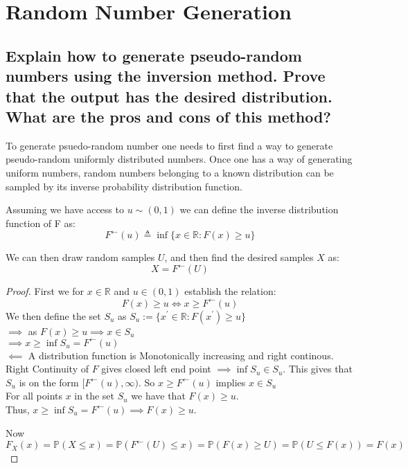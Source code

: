 \documentclass[a4paper]{article}
\begin{document}
  

\tableofcontents

\newpage

\section{Random Number Generation}

\subsection[The inversion method]{Explain how to generate pseudo-random numbers using the inversion method. Prove that the output has the desired distribution. What are the pros and cons of this method?}
To generate psuedo-random number one needs to first find a way to generate pseudo-random uniformly distributed numbers. Once one has a way of generating uniform numbers, random numbers belonging to a known distribution can be sampled by its inverse probability distribution function.

Assuming we have access to $u \sim (0,1)$ we can define the inverse distribution function of F as:
\begin{equation}
    F^\leftarrow(u) \triangleq \inf\{x\in\mathbb{R}: F(x) \geq u\}
\end{equation}

We can then draw random samples $U$, and then find the desired samples $X$ as:
\begin{equation}
    X = F^\leftarrow(U)
\end{equation}


\begin{proof}
    First we for $ x\in\mathbb{R}$ and $u \in(0,1)$ establish the relation:
    \begin{equation}
        F(x)\geq u\iff x\geq F^\leftarrow(u)
    \end{equation}
    We then define the set $S_u$ as $S_u :=\{x^\prime \in \mathbb{R} : F(x^\prime)\geq u\}$ \\
    $\implies$ as $F(x) \geq u \implies x \in S_u$ \\
    $\implies x \geq \inf S_u = F^\leftarrow(u)$ \\

    $\impliedby$ A distribution function is Monotonically increasing and right continous. \\
    Right Continuity of $F$ gives closed left end point $\implies \inf S_u \in S_u$. This gives that $S_u$ is on the form $[F^\leftarrow(u),\infty)$. So $x\geq F^\leftarrow(u)$ implies $x\in S_u$\\
    For all points $x$ in the set $S_u$ we have that $F(x) \geq u$. \\Thus, $x \geq \inf S_u = F^\leftarrow(u) \implies F(x) \geq u$.

    Now
    \begin{equation*}
        F_X(x) = \mathbb{P}(X\leq x) = \mathbb{P}(F^\leftarrow(U) \leq x) = \mathbb{P}(F(x) \geq U) = \mathbb{P}(U \leq F(x)) = F(x)
    \end{equation*}
\end{proof}
\end{document}
